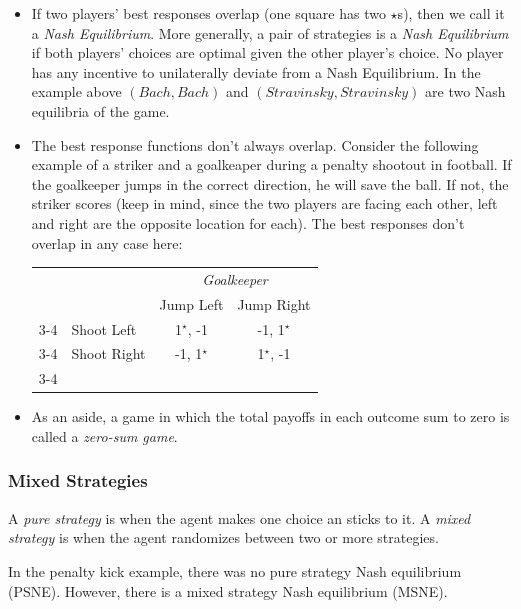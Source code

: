 \documentclass{article}
\begin{document}
\begin{itemize}
\begin{center}
\begin{tabular}{llcc}
      \end{tabular}
    \end{center}
  \item If two players' best responses overlap (one square has two $\star$s), then we call it a \emph{Nash Equilibrium}. More generally, a pair of strategies is a \emph{Nash Equilibrium} if both players' choices are optimal given the other player's choice. No player has any incentive to unilaterally deviate from a Nash Equilibrium. In the example above $\left( Bach, Bach \right)$ and $\left( Stravinsky, Stravinsky \right)$ are two Nash equilibria of the game.
  \item The best response functions don't always overlap. Consider the following example of a striker and a goalkeaper during a penalty shootout in football. If the goalkeeper jumps in the correct direction, he will save the ball. If not, the striker scores (keep in mind, since the two players are facing each other, left and right are the opposite location for each). The best responses don't overlap in any case here:
    \begin{center}
      \begin{tabular}{llcc}
        & & \multicolumn{2}{c}{\emph{Goalkeeper}} \\
        & & Jump Left & Jump Right \\ \cline{3-4}
        \multirow{2}{*}{\emph{Striker}} & Shoot Left & \multicolumn{1}{|c|}{1$^\star$, -1} & \multicolumn{1}{c|}{-1, 1$^\star$} \\ \cline{3-4}
        & Shoot Right & \multicolumn{1}{|c|}{-1, 1$^\star$} & \multicolumn{1}{c|}{1$^\star$, -1} \\ \cline{3-4}
      \end{tabular}
    \end{center}
  \item As an aside, a game in which the total payoffs in each outcome sum to zero is called a \emph{zero-sum game}.
\end{itemize}
\subsubsection*{Mixed Strategies}
A \emph{pure strategy} is when the agent makes one choice an sticks to it. A \emph{mixed strategy} is when the agent randomizes between two or more strategies.

In the penalty kick example, there was no pure strategy Nash equilibrium (PSNE). However, there is a mixed strategy Nash equilibrium (MSNE).
\end{document}

